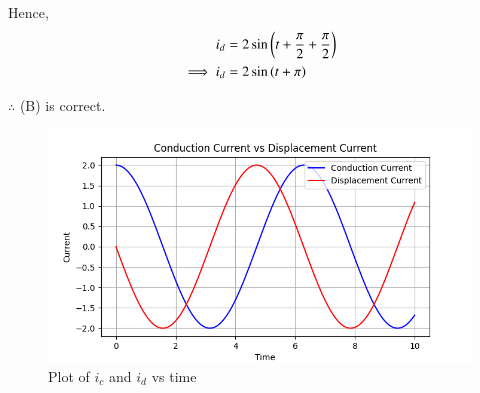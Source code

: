 \documentclass[journal,12pt,twocolumn]{IEEEtran}
\begin{document}
Hence,
\begin{align}
    i_d &= 2\sin\left(t + \frac{\pi}{2} + \frac{\pi}{2}\right)\\
    \implies i_d &= 2\sin\left(t+\pi\right)
\end{align}

$\therefore$ (B) is correct.

\begin{figure}[ht]
    \centering
    \includegraphics[width=\columnwidth]{figs/Figure_1.png}
    \caption{Plot of $i_c$ and $i_d$ vs time}
    \label{fig:fig_gate_ec_2022_24_1}
\end{figure}
\end{document}
